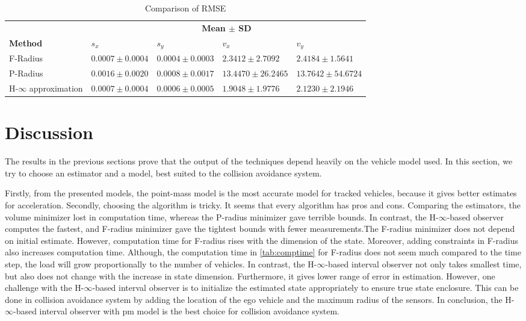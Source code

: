 \begin{table}[!h]
\caption{Comparison of RMSE}
	\centering
	\renewcommand{\arraystretch}{1.1}
	\small	
	\begin{tabular}{l l l l l}
		\toprule 
		& \multicolumn{4}{c}{\textbf{Mean $\pm$ SD}} \\ \cmidrule{2-5}
		\textbf{Method} & \textbf{$s_x$} & \textbf{$s_y$} & \textbf{$v_x$} & \textbf{$v_y$}\\ \midrule
		F-Radius & $0.0007\pm 0.0004$ &  $0.0004  \pm 0.0003$ &  $2.3412 \pm 2.7092$ &   $2.4184 \pm 1.5641$ \\
		P-Radius & $0.0016 \pm 0.0020$ &   $0.0008 \pm 0.0017$  & $13.4470 \pm 26.2465$ &  $13.7642 \pm 54.6724$\\
		H-$\infty$ approximation & $0.0007 \pm 0.0004$ &  $0.0006 \pm 0.0005$   & $1.9048 \pm  1.9776$  &  $ 2.1230 \pm  2.1946$\\
		\bottomrule
	\end{tabular}
	\label{tab:errormean}
\end{table}

\section{Discussion}
The results in the previous sections prove that the output of the techniques depend heavily on the vehicle model used. In this section, we try to choose an estimator and a model, best suited to the collision avoidance system. 

Firstly, from the presented models, the point-mass model is the most accurate model for tracked vehicles, because it gives better estimates for acceleration. Secondly, choosing the algorithm is tricky. It seems that every algorithm has pros and cons. Comparing the estimators, the volume minimizer lost in computation time, whereas the P-radius minimizer gave terrible bounds. In contrast, the H-$\infty$-based observer computes the fastest, and F-radius minimizer gave the tightest bounds with fewer measurements.The F-radius minimizer does not depend on initial estimate. However, computation time for F-radius rises with the dimension of the state. Moreover, adding constraints in F-radius also increases computation time. Although, the computation time in \ref{tab:comptime} for F-radius does not seem much compared to the time step, the load will grow proportionally to the number of vehicles. In contrast, the H-$\infty$-based interval observer not only takes smallest time, but also does not change with the increase in state dimension. Furthermore, it gives lower range of error in estimation. However, one challenge with the H-$\infty$-based interval observer is to initialize the estimated state appropriately to ensure true state enclosure. This can be done in collision avoidance system by adding the location of the ego vehicle and the maximum radius of the sensors. In conclusion, the H-$\infty$-based interval observer with pm model is the best choice for collision avoidance system. 

